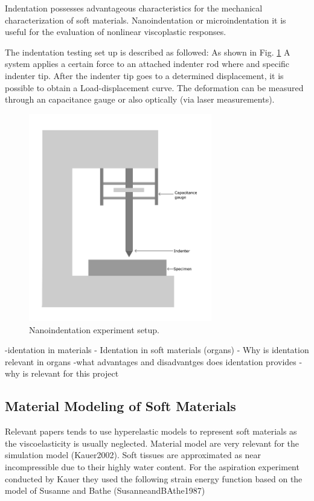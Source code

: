 Indentation possesses advantageous characteristics for the mechanical characterization
of soft materials. \cite{Liu2009}
Nanoindentation or microindentation it is useful for the evaluation of
nonlinear viscoplastic responses. \cite{Bergström2015}

The indentation testing set up is described as followed: As shown in Fig. \ref{fig:Nanoindentation} 
A system applies a certain force to an attached indenter rod where and specific 
indenter tip. After the indenter tip goes to a determined displacement, 
it is possible to obtain a Load-displacement curve.
The deformation can be measured through an capacitance gauge \cite{Bergström2015}
or also optically (via laser measurements).

 \begin{figure}[th]
        \centering
        \includegraphics[width=8cm]{Images/Nanoindentationresize}
        \decoRule
        \caption[Nanoindentation]{Nanoindentation experiment setup.}
        \label{fig:Nanoindentation}
        \end{figure}


-identation in materials
- Identation in soft materials (organs)
- Why is identation relevant in organs
-what advantages and disadvantges does identation provides
-why is relevant for this project 

\subsection{Material Modeling of Soft Materials}
 
Relevant papers tends to use hyperelastic models to represent soft materials as the viscoelasticity 
is usually neglected. 
Material model are very relevant for the simulation model (Kauer2002).
Soft tissues are approximated as near incompressible due to their highly water content.  
For the aspiration experiment conducted by Kauer they used the following strain energy
function based on the model of Susanne and Bathe (SusanneandBAthe1987)


